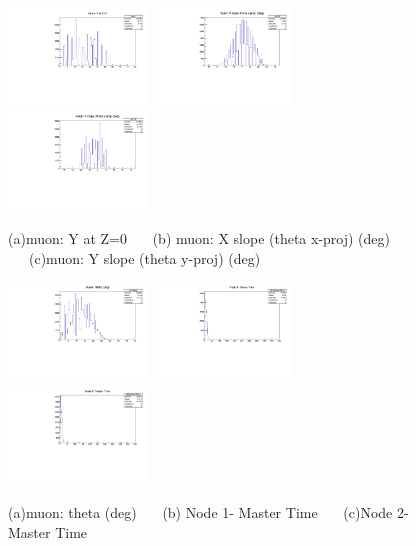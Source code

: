 \documentclass[a4paper,11pt]{article}
\theoremstyle{mytheor}
\begin{document}
\begin{figure}[H] 
\vspace*{-0.3cm} 
\includegraphics[width=0.33\textwidth,scale=0.5,trim=0 0 0 0,clip]{plotsdir/file0_muons-muY-1.pdf} 
\includegraphics[width=0.33\textwidth,scale=0.5,trim=0 0 0 0,clip]{plotsdir/file0_muons-muXS-1.pdf} 
\includegraphics[width=0.33\textwidth,scale=0.5,trim=0 0 0 0,clip]{plotsdir/file0_muons-muYS-1.pdf} 
\caption{(a)muon: Y at Z=0 ~~~(b) muon: X slope (theta x-proj) (deg) ~~~(c)muon: Y slope (theta y-proj) (deg) } 
\end{figure} 
\begin{figure}[H] 
\vspace*{-0.3cm} 
\includegraphics[width=0.33\textwidth,scale=0.5,trim=0 0 0 0,clip]{plotsdir/file0_muons-muTheta-1.pdf} 
\includegraphics[width=0.33\textwidth,scale=0.5,trim=0 0 0 0,clip]{plotsdir/file0_muons-N1MasterTime-1.pdf} 
\includegraphics[width=0.33\textwidth,scale=0.5,trim=0 0 0 0,clip]{plotsdir/file0_muons-N2MasterTime-1.pdf} 
\caption{(a)muon: theta (deg) ~~~(b) Node 1- Master Time ~~~(c)Node 2- Master Time } 
\end{figure} 
\end{document}
